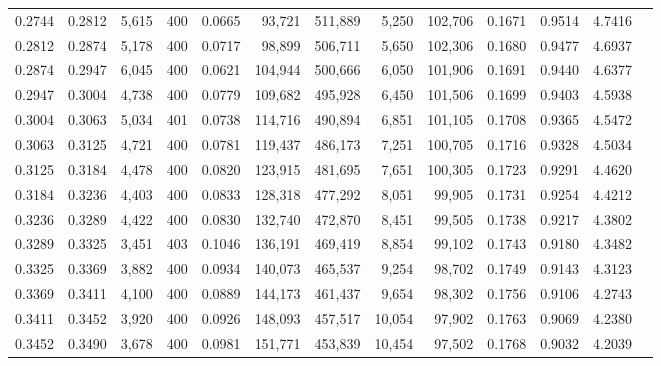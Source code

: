 \begin{tabular}{rrrrrrrrrrrrr}
0.2744 & 0.2812 &  5,615 & 400 &                                     0.0665 &  93,721 & 511,889 &   5,250 & 102,706 & 0.1671 & 0.9514 & 4.7416 \\
0.2812 & 0.2874 &  5,178 & 400 &                                     0.0717 &  98,899 & 506,711 &   5,650 & 102,306 & 0.1680 & 0.9477 & 4.6937 \\
0.2874 & 0.2947 &  6,045 & 400 &                                     0.0621 & 104,944 & 500,666 &   6,050 & 101,906 & 0.1691 & 0.9440 & 4.6377 \\
0.2947 & 0.3004 &  4,738 & 400 &                                     0.0779 & 109,682 & 495,928 &   6,450 & 101,506 & 0.1699 & 0.9403 & 4.5938 \\
0.3004 & 0.3063 &  5,034 & 401 &                                     0.0738 & 114,716 & 490,894 &   6,851 & 101,105 & 0.1708 & 0.9365 & 4.5472 \\
0.3063 & 0.3125 &  4,721 & 400 &                                     0.0781 & 119,437 & 486,173 &   7,251 & 100,705 & 0.1716 & 0.9328 & 4.5034 \\
0.3125 & 0.3184 &  4,478 & 400 &                                     0.0820 & 123,915 & 481,695 &   7,651 & 100,305 & 0.1723 & 0.9291 & 4.4620 \\
0.3184 & 0.3236 &  4,403 & 400 &                                     0.0833 & 128,318 & 477,292 &   8,051 &  99,905 & 0.1731 & 0.9254 & 4.4212 \\
0.3236 & 0.3289 &  4,422 & 400 &                                     0.0830 & 132,740 & 472,870 &   8,451 &  99,505 & 0.1738 & 0.9217 & 4.3802 \\
0.3289 & 0.3325 &  3,451 & 403 &                                     0.1046 & 136,191 & 469,419 &   8,854 &  99,102 & 0.1743 & 0.9180 & 4.3482 \\
0.3325 & 0.3369 &  3,882 & 400 &                                     0.0934 & 140,073 & 465,537 &   9,254 &  98,702 & 0.1749 & 0.9143 & 4.3123 \\
0.3369 & 0.3411 &  4,100 & 400 &                                     0.0889 & 144,173 & 461,437 &   9,654 &  98,302 & 0.1756 & 0.9106 & 4.2743 \\
0.3411 & 0.3452 &  3,920 & 400 &                                     0.0926 & 148,093 & 457,517 &  10,054 &  97,902 & 0.1763 & 0.9069 & 4.2380 \\
0.3452 & 0.3490 &  3,678 & 400 &                                     0.0981 & 151,771 & 453,839 &  10,454 &  97,502 & 0.1768 & 0.9032 & 4.2039 \\

\end{tabular}
